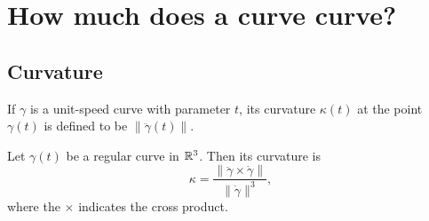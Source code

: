 \section{How much does a curve curve?}

\subsection{Curvature}

\begin{defn}
  If $\gamma$ is a unit-speed curve with parameter $t$, its curvature $\kappa(t)$
  at the point $\gamma(t)$ is defined to be $\|\ddot{\gamma}(t)\|$.
\end{defn}

\begin{proposition}
  Let $\gamma(t)$ be a regular curve in $\mathbb{R}^3$. Then its curvature is
  \[
    \kappa = \frac{\|\ddot{\gamma} \times \dot{\gamma}\|}{\|\dot{\gamma}\|^3},
  \]
  where the $\times$ indicates the cross product.
\end{proposition}